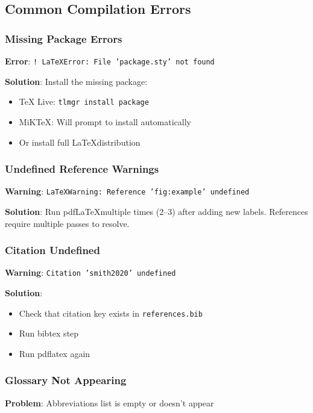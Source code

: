 \subsection*{Common Compilation Errors}

\subsubsection*{Missing Package Errors}

\textbf{Error}: \texttt{! \LaTeX Error: File 'package.sty' not found}

\textbf{Solution}: Install the missing package:
\begin{itemize}
    \item TeX Live: \texttt{tlmgr install package}
    \item MiKTeX: Will prompt to install automatically
    \item Or install full \LaTeX distribution
\end{itemize}

\subsubsection*{Undefined Reference Warnings}

\textbf{Warning}: \texttt{\LaTeX Warning: Reference 'fig:example' undefined}

\textbf{Solution}: Run pdf\LaTeX multiple times (2--3) after adding new labels. References require multiple passes to resolve.

\subsubsection*{Citation Undefined}

\textbf{Warning}: \texttt{Citation 'smith2020' undefined}

\textbf{Solution}:
\begin{itemize}
    \item Check that citation key exists in \texttt{references.bib}
    \item Run bibtex step
    \item Run pdflatex again
\end{itemize}

\subsubsection*{Glossary Not Appearing}

\textbf{Problem}: Abbreviations list is empty or doesn't appear

